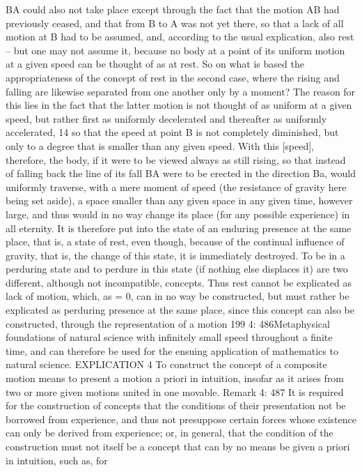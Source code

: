BA could also not take place except through the fact that the motion AB
had previously ceased, and that from B to A was not yet there, so that a
lack of all motion at B had to be assumed, and, according to the usual
explication, also rest – but one may not assume it, because no body at
a point of its uniform motion at a given speed can be thought of as at
rest. So on what is based the appropriateness of the concept of rest in the
second case, where the rising and falling are likewise separated from one
another only by a moment? The reason for this lies in the fact that the
latter motion is not thought of as uniform at a given speed, but rather
ﬁrst as uniformly decelerated and thereafter as uniformly accelerated, 14
so that the speed at point B is not completely diminished, but only to a
degree that is smaller than any given speed. With this [speed], therefore,
the body, if it were to be viewed always as still rising, so that instead of
falling back the line of its fall BA were to be erected in the direction Ba,
would uniformly traverse, with a mere moment of speed (the resistance
of gravity here being set aside), a space smaller than any given space in
any given time, however large, and thus would in no way change its place
(for any possible experience) in all eternity. It is therefore put into the
state of an enduring presence at the same place, that is, a state of rest,
even though, because of the continual inﬂuence of gravity, that is, the
change of this state, it is immediately destroyed. To be in a perduring state
and to perdure in this state (if nothing else displaces it) are two different,
although not incompatible, concepts. Thus rest cannot be explicated as
lack of motion, which, as = 0, can in no way be constructed, but must
rather be explicated as perduring presence at the same place, since this
concept can also be constructed, through the representation of a motion
199
4: 486Metaphysical foundations of natural science
with inﬁnitely small speed throughout a ﬁnite time, and can therefore
be used for the ensuing application of mathematics to natural science.
EXPLICATION 4
To construct the concept of a composite motion means to present a motion
a priori in intuition, insofar as it arises from two or more given motions
united in one movable.
Remark
4: 487
It is required for the construction of concepts that the conditions of their
presentation not be borrowed from experience, and thus not presuppose
certain forces whose existence can only be derived from experience; or,
in general, that the condition of the construction must not itself be a
concept that can by no means be given a priori in intuition, such as, for
